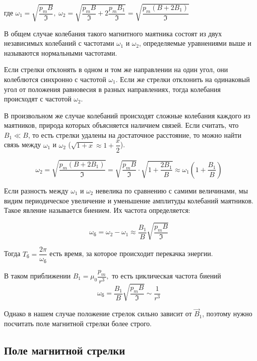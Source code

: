 \documentclass{letask}
\begin{document}
где $\omega_1 = \sqrt{\dfrac{p_m B}{\mathfrak{I}}}, \; \omega_2 = \sqrt{\dfrac{p_m B}{\mathfrak{I}} + 2\dfrac{p_m B_1}{\mathfrak{I}}} = \sqrt{\dfrac{p_m(B+2B_1)}{\mathfrak{I}}}$

В общем случае колебания такого магнитного маятника состоят из двух независимых колебаний с частотами $\omega_1$ и $\omega_2$, определяемые уравнениями выше и называются нормальными частотами. 

Если стрелки отклонять в одном и том же направлении на один угол, они колеблются синхронно с частотой $\omega_1$. Если же стрелки отклонить на одинаковый угол от положения равновесия в разных направлениях, тогда колебания происходят с частотой $\omega_2$.

В произвольном же случае колебаний происходят сложные колебания каждого из маятников, природа которых объясняется наличием связей.
Если считать, что $B_1 \ll B$, то есть стрелки удалены на достаточное расстояние, то можно найти связь между $\omega_1$ и $\omega_2$ ($\sqrt{1+x} \approx 1 + \dfrac{x}{2}$).

\begin{equation}
\omega_2 = \sqrt{\dfrac{p_m(B+2B_1)}{\mathfrak{I}}} = \sqrt{\dfrac{p_m B}{\mathfrak{I}}} \cdot \sqrt{1+\dfrac{2B_1}{B}} \approx \omega_1(1+\dfrac{B_1}{B})
\end{equation}

Если разность между $\omega_1$ и $\omega_2$ невелика по сравнению с самими величинами, мы видим периодическое увеличение и уменьшение амплитуды колебаний маятников. Такое явление называется биением. Их частота определяется:

\begin{equation}
\omega_{\text{б}} = \omega_2 - \omega_1 \approx \dfrac{B_1}{B} \sqrt{\dfrac{p_m B}{\mathfrak{I}}}
\end{equation}

Тогда $T_\text{б} = \dfrac{2\pi}{\omega_\text{б}}$ есть время, за которое происходит перекачка энергии.

В таком приближении $B_1 = \mu_0 \dfrac{p_m}{r^3},$ то есть циклическая частота биений $$\omega_\text{б} = \dfrac{B_1}{B} \sqrt{\dfrac{p_m B}{\mathfrak{I}}} \sim \dfrac{1}{r^3}$$

Однако в нашем случае положение стрелок сильно зависит от $\vec B_1$, поэтому нужно посчитать поле магнитной стрелки более строго.

\subsection{Поле магнитной стрелки}
\end{document}
